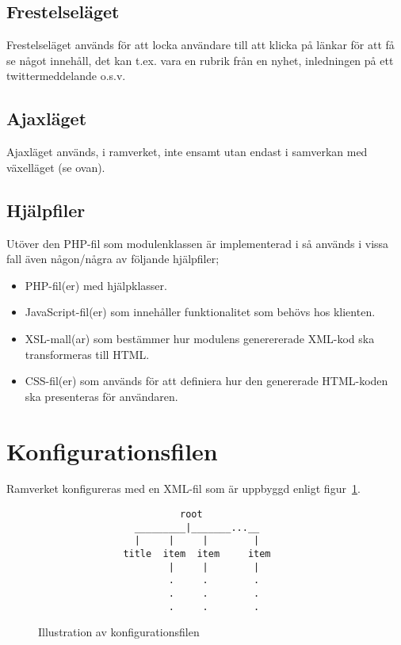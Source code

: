 \subsection{Frestelseläget}
Frestelseläget används för att locka användare till att klicka på länkar
för att få se något innehåll, det kan t.ex. vara en rubrik från en
nyhet, inledningen på ett twittermeddelande o.s.v.

\subsection{Ajaxläget}
Ajaxläget används, i ramverket, inte ensamt utan endast i samverkan med
växelläget (se ovan).

\subsection{Hjälpfiler}
Utöver den PHP-fil som modulenklassen är implementerad i så används i
vissa fall även någon/några av följande hjälpfiler;

\begin{itemize}
  \item PHP-fil(er) med hjälpklasser.
  \item JavaScript-fil(er) som innehåller funktionalitet som behövs hos
    klienten.
  \item XSL-mall(ar) som bestämmer hur modulens generererade XML-kod ska
    transformeras till HTML.
  \item CSS-fil(er) som används för att definiera hur den genererade
    HTML-koden ska presenteras för användaren.
\end{itemize}

\section{Konfigurationsfilen}
Ramverket konfigureras med en XML-fil som är uppbyggd enligt
figur~\ref{fig:xml-config}.

\begin{figure}[h]
\begin{verbatim}
                         root
                 _________|_______...__
                 |     |     |        |
               title  item  item     item
                       |     |        |
                       .     .        .
                       .     .        .
                       .     .        .
\end{verbatim}
\caption{Illustration av konfigurationsfilen}
\label{fig:xml-config}
\end{figure}

